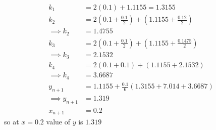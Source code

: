 \documentclass[journal,12pt,twocolumn]{IEEEtran}
\theoremstyle{remark}
\begin{document}
\begin{align}
    k_1&=2(0.1)+1.1155=1.3155\\
    k_2&=2(0.1+\frac{0.1}{2})+(1.1155+\frac{0.12}{2})\\
    \implies k_2&= 1.4755\\
    k_3&=2(0.1+\frac{0.1}{2})+(1.1155+\frac{0.1475}{2})\\
    \implies k_3&=2.1532\\
    k_4&=2(0.1+0.1)+(1.1155+2.1532)\\
    \implies k_4&=3.6687\\
     y_{n+1}&=1.1155+\frac{0.1}{6}(1.3155+7.014+3.6687)\\
     \implies y_{n+1}&=1.319\\
     x_{n+1}&=0.2
\end{align}
so at $x=0.2$ value of $y$ is $1.319$
\end{document}
